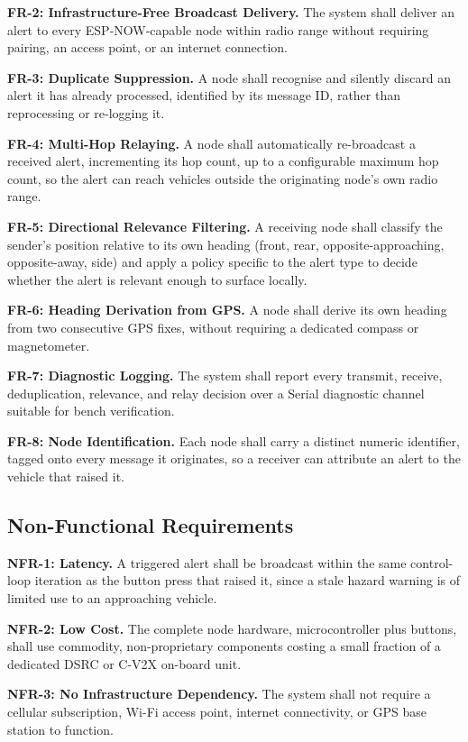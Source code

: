\documentclass[12pt,a4paper]{report}
\begin{document}
\textbf{FR-2: Infrastructure-Free Broadcast Delivery.} The system shall deliver an alert to every ESP-NOW-capable node within radio range without requiring pairing, an access point, or an internet connection.

\textbf{FR-3: Duplicate Suppression.} A node shall recognise and silently discard an alert it has already processed, identified by its message ID, rather than reprocessing or re-logging it.

\textbf{FR-4: Multi-Hop Relaying.} A node shall automatically re-broadcast a received alert, incrementing its hop count, up to a configurable maximum hop count, so the alert can reach vehicles outside the originating node's own radio range.

\textbf{FR-5: Directional Relevance Filtering.} A receiving node shall classify the sender's position relative to its own heading (front, rear, opposite-approaching, opposite-away, side) and apply a policy specific to the alert type to decide whether the alert is relevant enough to surface locally.

\textbf{FR-6: Heading Derivation from GPS.} A node shall derive its own heading from two consecutive GPS fixes, without requiring a dedicated compass or magnetometer.

\textbf{FR-7: Diagnostic Logging.} The system shall report every transmit, receive, deduplication, relevance, and relay decision over a Serial diagnostic channel suitable for bench verification.

\textbf{FR-8: Node Identification.} Each node shall carry a distinct numeric identifier, tagged onto every message it originates, so a receiver can attribute an alert to the vehicle that raised it.

\subsection{Non-Functional Requirements}

\textbf{NFR-1: Latency.} A triggered alert shall be broadcast within the same control-loop iteration as the button press that raised it, since a stale hazard warning is of limited use to an approaching vehicle.

\textbf{NFR-2: Low Cost.} The complete node hardware, microcontroller plus buttons, shall use commodity, non-proprietary components costing a small fraction of a dedicated DSRC or C-V2X on-board unit.

\textbf{NFR-3: No Infrastructure Dependency.} The system shall not require a cellular subscription, Wi-Fi access point, internet connectivity, or GPS base station to function.
\end{document}
